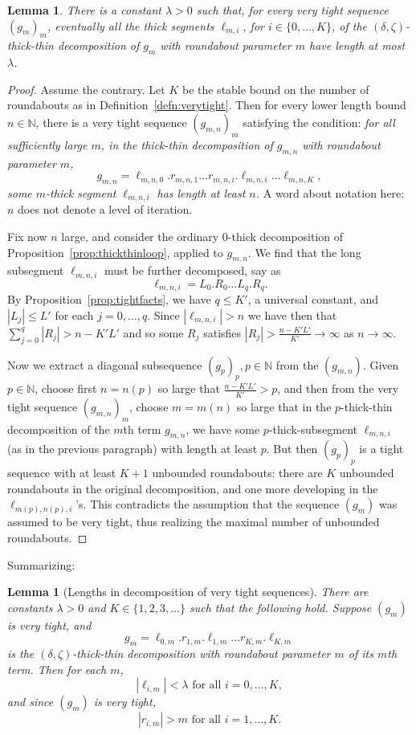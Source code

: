 \documentclass{amsart}
\newcommand\N{{\mathbb{N}}}
\newtheorem{lem}[thm]{Lemma}
\theoremstyle{definition}
\theoremstyle{remark}
\begin{document}
\begin{lem}\label{lemma:lambda}
  There is a constant $\lambda>0$ such that, for every very tight sequence $(g_m)_m$, eventually all the thick segments $\ell_{m,i}$, for $i\in\{0,\dots,K\}$, of the $(\delta,\zeta)$-thick-thin decomposition of $g_m$ with roundabout parameter $m$ have length at most $\lambda$.
\end{lem}
\begin{proof}
  Assume the contrary.  Let $K$ be the stable bound on the number of roundabouts as in Definition~\ref{defn:verytight}. Then for every lower length bound $n\in\N$, there is a very tight sequence $(g_{m,n})_m$ satisfying the condition:  \emph{for all sufficiently large $m$, in the thick-thin decomposition of $g_{m,n}$ with roundabout parameter $m$,
   \[ g_{m,n}=\ell_{m,n,0} . r_{m,n,1} \ldots r_{m,n,i} . \ell_{m,n,i}\ldots \ell_{m,n,K},\]
some $m$-thick segment $\ell_{m,n,i}$ has length at least $n$.}  A word about notation here: $n$ does not denote a level of iteration. 

Fix now $n$ large, and consider  the ordinary $0$-thick decomposition of Proposition~\ref{prop:thickthinloop}, applied to $g_{m,n}$. We find that the long subsegment $\ell_{m,n,i}$ must be further decomposed, say as 
\[ \ell_{m,n,i}=L_0 . R_0\ldots L_q .R_q.\]
By Proposition~\ref{prop:tightfacts}, we have $q\leq K'$, a universal constant, and $|L_j| \leq L'$ for each $j=0, \ldots, q$. Since $|\ell_{m,n,i}|>n$ we have then that $\sum_{j=0}^q |R_j| > n-K'L'$ and so some $R_j$ satisfies $|R_j| > \frac{n-K'L'}{K'}\to\infty$ as $n\to\infty$.  

Now we extract a diagonal subsequence $(g_p)_p, p\in \N$ from the $(g_{m,n})$. Given $p\in \N$, choose first $n=n(p)$ so large that $\frac{n-K'L'}{K'} > p$, and then from the very tight sequence $(g_{m,n})_m$, choose $m=m(n)$ so large that in the $p$-thick-thin decomposition of the $m$th term $g_{m,n}$, we have some $p$-thick-subsegment $\ell_{m,n,i}$ (as in the previous paragraph) with length at least $p$. But then $(g_p)_p$ is a tight sequence with at least $K+1$ unbounded roundabouts: there are $K$ unbounded roundabouts in the original decomposition, and one more developing in the $\ell_{m(p), n(p), i}$'s. This contradicts the assumption that the sequence $(g_m)$ was assumed to be very tight, thus realizing the maximal number of unbounded roundabouts. 
\end{proof}

\noindent Summarizing:
\begin{lem}[Lengths in decomposition of very tight sequences]\label{lemma:ldvt}
  There are constants $\lambda>0$ and $K\in \{1, 2, 3, \ldots\}$ such that the following hold. Suppose $(g_m)$ is very tight, and 
\[ g_m = \ell_{0,m}.r_{1,m}.\ell_{1,m}\ldots r_{K,m}.\ell_{K,m}\]
is the $(\delta, \zeta)$-thick-thin decomposition with roundabout parameter $m$ of its $m$th term. Then for each $m$, 
\[ |\ell_{i,m}| < \lambda\text{ for all } i=0,\ldots,K,\]
and since $(g_m)$ is very tight,
\[ |r_{i,m}| >m\text{ for all } i=1,\ldots, K.\]
\end{lem}
\end{document}
